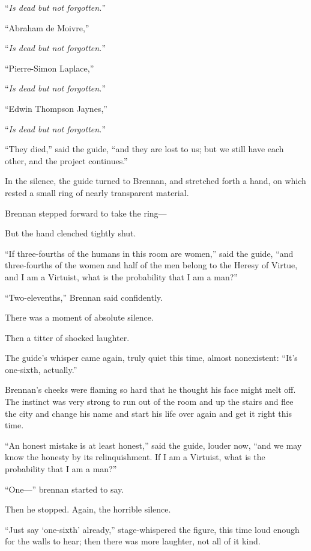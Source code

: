 {
 ``\textit{Is dead but not
forgotten.}''}

{
 ``Abraham de Moivre,''}

{
 ``\textit{Is dead but not
forgotten.}''}

{
 ``Pierre-Simon Laplace,''}

{
 ``\textit{Is dead but not
forgotten.}''}

{
 ``Edwin Thompson Jaynes,''}

{
 ``\textit{Is dead but not
forgotten.}''}

{
 ``They died,'' said the guide,
``and they are lost to us; but we still have each
other, and the project continues.''}

{
 In the silence, the guide turned to Brennan, and stretched forth a
hand, on which rested a small ring of nearly transparent material.}

{
 Brennan stepped forward to take the ring---}

{
 But the hand clenched tightly shut.}

{
 ``If three-fourths of the humans in this room are
women,'' said the guide, ``and
three-fourths of the women and half of the men belong to the Heresy of
Virtue, and I am a Virtuist, what is the probability that I am a
man?''}

{
 ``Two-elevenths,'' Brennan said
confidently.}

{
 There was a moment of absolute silence.}

{
 Then a titter of shocked laughter.}

{
 The guide's whisper came again, truly quiet this
time, almost nonexistent: ``It's
one-sixth, actually.''}

{
 Brennan's cheeks were flaming so hard that he
thought his face might melt off. The instinct was very strong to run
out of the room and up the stairs and flee the city and change his name
and start his life over again and get it right this time.}

{
 ``An honest mistake is at least
honest,'' said the guide, louder now,
``and we may know the honesty by its relinquishment.
If I am a Virtuist, what is the probability that I am a
man?''}

{
 ``One---'' brennan started to
say.}

{
 Then he stopped. Again, the horrible silence.}

{
 ``Just say
`one-sixth' already,''
stage-whispered the figure, this time loud enough for the walls to
hear; then there was more laughter, not all of it kind.}

